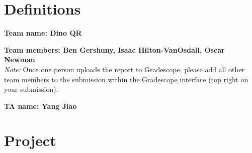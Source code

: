 \section*{Definitions}

\textbf{Team name: Dino QR}

\textbf{Team members: Ben Gershuny, Isaac Hilton-VanOsdall, Oscar Newman}\\
\emph{Note:} Once one person uploads the report to Gradescope, please add all other team members to the submission within the Gradescope interface (top right on your submission).

\textbf{TA name: Yang Jiao}

\section*{Project}
